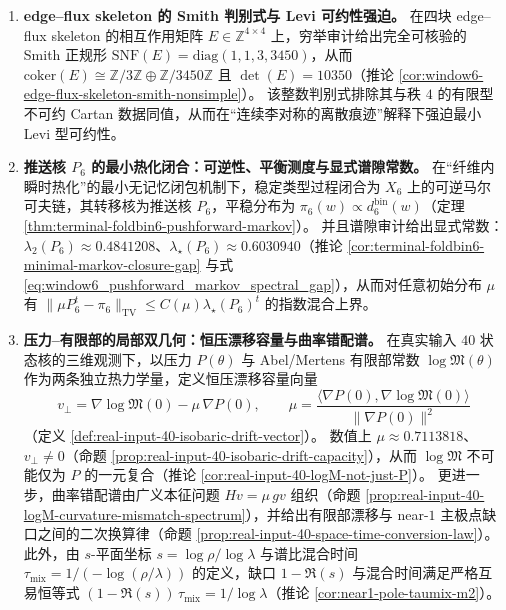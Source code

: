 \begin{enumerate}
  \item \textbf{edge--flux skeleton 的 Smith 判别式与 Levi 可约性强迫。}
  在四块 edge--flux skeleton 的相互作用矩阵 \(E\in\mathbb{Z}^{4\times4}\) 上，穷举审计给出完全可核验的 Smith 正规形
  \(
  \mathrm{SNF}(E)=\mathrm{diag}(1,1,3,3450)
  \)，从而 \(\mathrm{coker}(E)\cong \mathbb{Z}/3\mathbb{Z}\oplus \mathbb{Z}/3450\mathbb{Z}\) 且 \(\det(E)=10350\)（推论 \ref{cor:window6-edge-flux-skeleton-smith-nonsimple}）。
  该整数判别式排除其与秩 \(4\) 的有限型不可约 Cartan 数据同值，从而在“连续李对称的离散痕迹”解释下强迫最小 Levi 型可约性。

  \item \textbf{推送核 \texorpdfstring{$P_6$}{P6} 的最小热化闭合：可逆性、平衡测度与显式谱隙常数。}
  在“纤维内瞬时热化”的最小无记忆闭包机制下，稳定类型过程闭合为 \(X_6\) 上的可逆马尔可夫链，其转移核为推送核 \(P_6\)，平稳分布为 \(\pi_6(w)\propto d^{\mathrm{bin}}_6(w)\)（定理 \ref{thm:terminal-foldbin6-pushforward-markov}）。
  并且谱隙审计给出显式常数：\(\lambda_2(P_6)\approx 0.4841208\)、\(\lambda_\star(P_6)\approx 0.6030940\)（推论 \ref{cor:terminal-foldbin6-minimal-markov-closure-gap} 与式 \eqref{eq:window6_pushforward_markov_spectral_gap}），从而对任意初始分布 \(\mu\) 有
  \(
  \|\mu P_6^t-\pi_6\|_{\mathrm{TV}}\le C(\mu)\lambda_\star(P_6)^t
  \)
  的指数混合上界。

  \item \textbf{压力--有限部的局部双几何：恒压漂移容量与曲率错配谱。}
  在真实输入 \(40\) 状态核的三维观测下，以压力 \(P(\theta)\) 与 Abel/Mertens 有限部常数 \(\log\mathfrak{M}(\theta)\) 作为两条独立热力学量，定义恒压漂移容量向量
  \[
  v_\perp=\nabla\log\mathfrak{M}(0)-\mu\,\nabla P(0),\qquad
  \mu=\frac{\langle\nabla P(0),\nabla\log\mathfrak{M}(0)\rangle}{\|\nabla P(0)\|^2}
  \]
  （定义 \ref{def:real-input-40-isobaric-drift-vector}）。
  数值上 \(\mu\approx 0.7113818\)、\(v_\perp\neq 0\)（命题 \ref{prop:real-input-40-isobaric-drift-capacity}），从而 \(\log\mathfrak{M}\) 不可能仅为 \(P\) 的一元复合（推论 \ref{cor:real-input-40-logM-not-just-P}）。
  更进一步，曲率错配谱由广义本征问题 \(Hv=\mu\,gv\) 组织（命题 \ref{prop:real-input-40-logM-curvature-mismatch-spectrum}），并给出有限部漂移与 near-\(1\) 主极点缺口之间的二次换算律（命题 \ref{prop:real-input-40-space-time-conversion-law}）。
  此外，由 \(s\)-平面坐标 \(s=\log\rho/\log\lambda\) 与谱比混合时间 \(\tau_{\mathrm{mix}}=1/(-\log(\rho/\lambda))\) 的定义，缺口 \(1-\Re(s)\) 与混合时间满足严格互易恒等式 \((1-\Re(s))\,\tau_{\mathrm{mix}}=1/\log\lambda\)（推论 \ref{cor:near1-pole-taumix-m2}）。


\end{enumerate}
